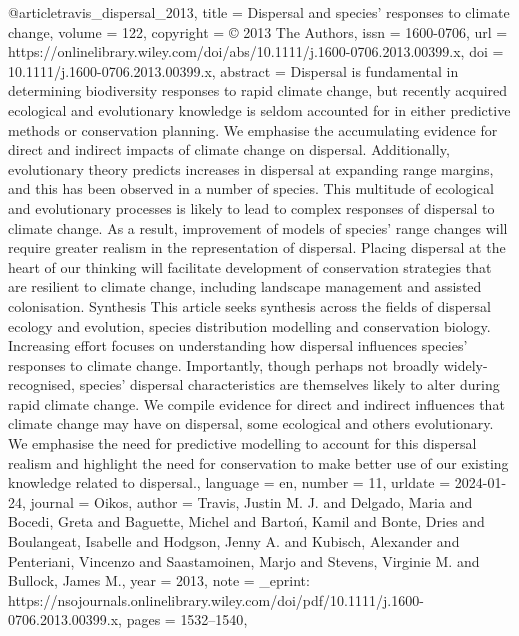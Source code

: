 {{{@article{travis_dispersal_2013,
	title = {Dispersal and species’ responses to climate change},
	volume = {122},
	copyright = {© 2013 The Authors},
	issn = {1600-0706},
	url = {https://onlinelibrary.wiley.com/doi/abs/10.1111/j.1600-0706.2013.00399.x},
	doi = {10.1111/j.1600-0706.2013.00399.x},
	abstract = {Dispersal is fundamental in determining biodiversity responses to rapid climate change, but recently acquired ecological and evolutionary knowledge is seldom accounted for in either predictive methods or conservation planning. We emphasise the accumulating evidence for direct and indirect impacts of climate change on dispersal. Additionally, evolutionary theory predicts increases in dispersal at expanding range margins, and this has been observed in a number of species. This multitude of ecological and evolutionary processes is likely to lead to complex responses of dispersal to climate change. As a result, improvement of models of species’ range changes will require greater realism in the representation of dispersal. Placing dispersal at the heart of our thinking will facilitate development of conservation strategies that are resilient to climate change, including landscape management and assisted colonisation. Synthesis This article seeks synthesis across the fields of dispersal ecology and evolution, species distribution modelling and conservation biology. Increasing effort focuses on understanding how dispersal influences species' responses to climate change. Importantly, though perhaps not broadly widely-recognised, species' dispersal characteristics are themselves likely to alter during rapid climate change. We compile evidence for direct and indirect influences that climate change may have on dispersal, some ecological and others evolutionary. We emphasise the need for predictive modelling to account for this dispersal realism and highlight the need for conservation to make better use of our existing knowledge related to dispersal.},
	language = {en},
	number = {11},
	urldate = {2024-01-24},
	journal = {Oikos},
	author = {Travis, Justin M. J. and Delgado, Maria and Bocedi, Greta and Baguette, Michel and Bartoń, Kamil and Bonte, Dries and Boulangeat, Isabelle and Hodgson, Jenny A. and Kubisch, Alexander and Penteriani, Vincenzo and Saastamoinen, Marjo and Stevens, Virginie M. and Bullock, James M.},
	year = {2013},
	note = {\_eprint: https://nsojournals.onlinelibrary.wiley.com/doi/pdf/10.1111/j.1600-0706.2013.00399.x},
	pages = {1532--1540},
}

}}}
